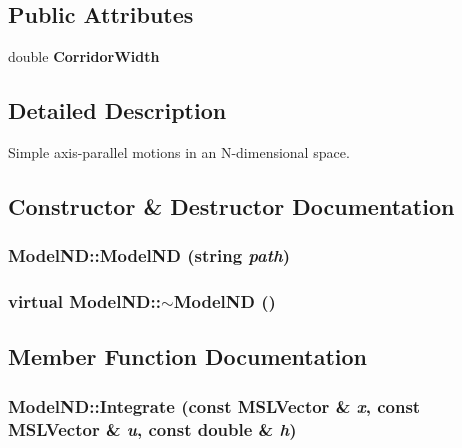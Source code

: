\subsection*{Public Attributes}
\begin{CompactItemize}
\item 
double {\bf Corridor\-Width}
\end{CompactItemize}


\subsection{Detailed Description}
Simple axis-parallel motions in an N-dimensional space.



\subsection{Constructor \& Destructor Documentation}
\subsubsection{\setlength{\rightskip}{0pt plus 5cm}Model\-ND::Model\-ND (string {\em path})}\label{classModelND_a0}


\subsubsection{\setlength{\rightskip}{0pt plus 5cm}virtual Model\-ND::$\sim$Model\-ND ()\hspace{0.3cm}{\tt  [inline, virtual]}}\label{classModelND_a1}




\subsection{Member Function Documentation}
\subsubsection{ Model\-ND::Integrate (const {\bf MSLVector} \& {\em x}, const {\bf MSLVector} \& {\em u}, const double \& {\em h})\hspace{0.3cm}{\tt  [virtual]}}\label{classModelND_a3}


